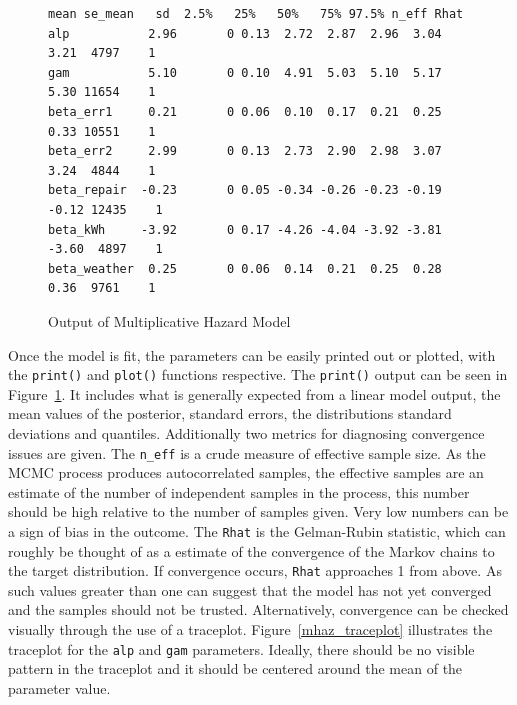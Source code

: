 \begin{figure}[htbp]
    \centering
    \begin{lstlisting}[belowskip=-2 \baselineskip]
              mean se_mean   sd  2.5%   25%   50%   75% 97.5% n_eff Rhat
alp           2.96       0 0.13  2.72  2.87  2.96  3.04  3.21  4797    1
gam           5.10       0 0.10  4.91  5.03  5.10  5.17  5.30 11654    1
beta_err1     0.21       0 0.06  0.10  0.17  0.21  0.25  0.33 10551    1
beta_err2     2.99       0 0.13  2.73  2.90  2.98  3.07  3.24  4844    1
beta_repair  -0.23       0 0.05 -0.34 -0.26 -0.23 -0.19 -0.12 12435    1
beta_kWh     -3.92       0 0.17 -4.26 -4.04 -3.92 -3.81 -3.60  4897    1
beta_weather  0.25       0 0.06  0.14  0.21  0.25  0.28  0.36  9761    1
\end{lstlisting}
    \caption{Output of Multiplicative Hazard Model}
    \label{mhaz_print}
\end{figure}

Once the model is fit, the parameters can be easily printed out or plotted, with the \lstinline{print()} and \lstinline{plot()} functions respective. The \lstinline{print()} output can be seen in Figure~\ref{mhaz_print}. It includes what is generally expected from a linear model output, the mean values of the posterior, standard errors, the distributions standard deviations and quantiles. Additionally two metrics for diagnosing convergence issues are given. The \lstinline{n_eff} is a crude measure of effective sample size. As the MCMC process produces autocorrelated samples, the effective samples are an estimate of the number of independent samples in the process, this number should be high relative to the number of samples given. Very low numbers can be a sign of bias in the outcome. The \lstinline{Rhat} is the Gelman-Rubin statistic, which can roughly be thought of as a estimate of the convergence of the Markov chains to the target distribution\cite{Gelman1992}. If convergence occurs, \lstinline{Rhat} approaches 1 from above. As such values greater than one can suggest that the model has not yet converged and the samples should not be trusted. Alternatively, convergence can be checked visually through the use of a traceplot. Figure~\ref{mhaz_traceplot} illustrates the traceplot for the \lstinline{alp} and \lstinline{gam} parameters. Ideally, there should be no visible pattern in the traceplot and it should be centered around the mean of the parameter value. 

